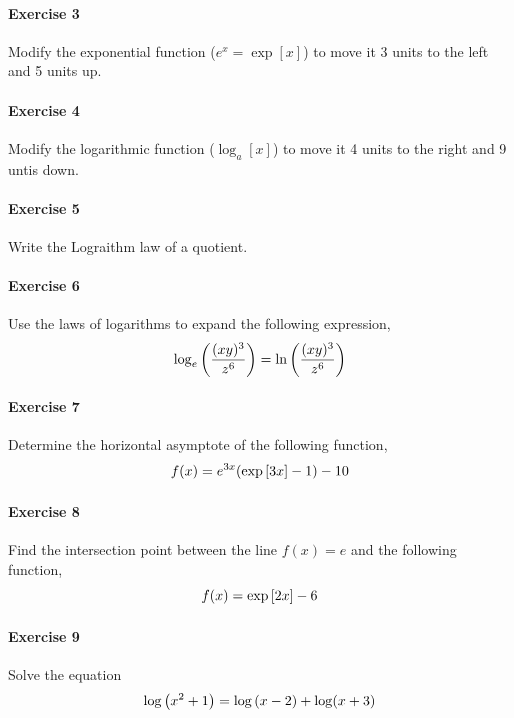 \documentclass[main.tex]{subfiles}
\begin{document}
\paragraph{Exercise 3}
Modify the exponential function ($e^x=\exp[x]$) to move it 3 units to the left and 5 units up.

\paragraph{Exercise 4}
Modify the logarithmic function ($\log_a[x]$) to move it 4 units to the right and 9 untis down.

\paragraph{Exercise 5}
Write the Lograithm law of a quotient.

\paragraph{Exercise 6}
Use the laws of logarithms to expand the following expression, \[\log_e\qty(\frac{(xy)^3}{z^6})=\ln\qty(\frac{(xy)^3}{z^6})\]

\paragraph{Exercise 7}
Determine the horizontal asymptote of the following function, \[f(x)=e^{3x}\qty(\exp\qty[3x]-1)-10\]

\paragraph{Exercise 8}
Find the intersection point between the line $f(x)=e$ and the following function, \[f(x)=\exp\qty[2x]-6\]

\paragraph{Exercise 9}
Solve the equation \[\log\qty(x^2+1)=\log\qty(x-2)+\log(x+3)\]
\end{document}

